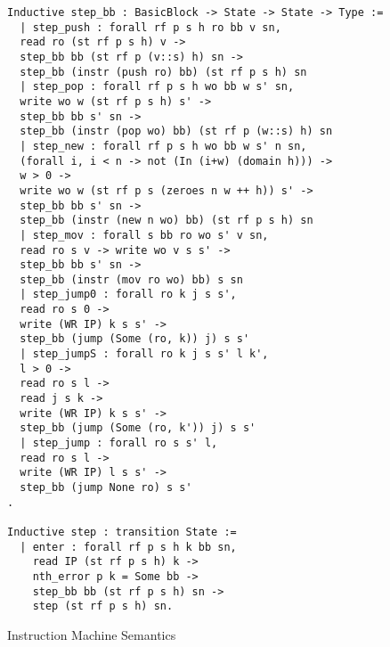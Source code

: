 \begin{figure}
\begin{lstlisting}
Inductive step_bb : BasicBlock -> State -> State -> Type :=
  | step_push : forall rf p s h ro bb v sn,
  read ro (st rf p s h) v ->
  step_bb bb (st rf p (v::s) h) sn ->
  step_bb (instr (push ro) bb) (st rf p s h) sn
  | step_pop : forall rf p s h wo bb w s' sn,
  write wo w (st rf p s h) s' ->
  step_bb bb s' sn ->
  step_bb (instr (pop wo) bb) (st rf p (w::s) h) sn
  | step_new : forall rf p s h wo bb w s' n sn,
  (forall i, i < n -> not (In (i+w) (domain h))) ->
  w > 0 ->
  write wo w (st rf p s (zeroes n w ++ h)) s' ->
  step_bb bb s' sn ->
  step_bb (instr (new n wo) bb) (st rf p s h) sn
  | step_mov : forall s bb ro wo s' v sn,
  read ro s v -> write wo v s s' ->
  step_bb bb s' sn ->
  step_bb (instr (mov ro wo) bb) s sn
  | step_jump0 : forall ro k j s s',
  read ro s 0 ->
  write (WR IP) k s s' ->
  step_bb (jump (Some (ro, k)) j) s s'
  | step_jumpS : forall ro k j s s' l k',
  l > 0 ->
  read ro s l ->
  read j s k ->
  write (WR IP) k s s' ->
  step_bb (jump (Some (ro, k')) j) s s'
  | step_jump : forall ro s s' l,
  read ro s l ->
  write (WR IP) l s s' ->
  step_bb (jump None ro) s s'
.

Inductive step : transition State :=
  | enter : forall rf p s h k bb sn,
    read IP (st rf p s h) k ->
    nth_error p k = Some bb ->
    step_bb bb (st rf p s h) sn ->
    step (st rf p s h) sn.
\end{lstlisting}
\caption{Instruction Machine Semantics}
\end{figure}

